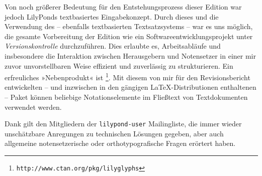 \documentclass{ulPlainA4}
\begin{document}
Von noch größerer Bedeutung für den Entstehungsprozess dieser Edition war jedoch LilyPonds textbasiertes Eingabekonzept.
Durch dieses und die Verwendung des -- ebenfalls textbasierten Textsatzsystems  -- war es uns möglich, die gesamte Vorbereitung der Edition wie ein Softwareentwicklungsprojekt unter \emph{Versionskontrolle} durchzuführen.
Dies erlaubte es, Arbeitsabläufe und insbesondere die Interaktion zwischen Herausgebern und Notensetzer in einer mir zuvor unvorstellbaren Weise effizient und zuverlässig zu strukturieren.
Ein erfreuliches »Nebenprodukt« ist \lilyglyphs{}%
\footnote{\texttt{http://www.ctan.org/pkg/lilyglyphs}}.
Mit diesem von mir für den Revisionsbericht entwickelten -- und inzwischen in den gängigen \LaTeX-Distributionen enthaltenen -- Paket können beliebige Notationselemente im Fließtext von Textdokumenten verwendet werden.

Dank gilt den Mitgliedern der \texttt{lilypond-user} Mailingliste, die immer wieder unschätzbare Anregungen zu technischen Lösungen gegeben, aber auch allgemeine notensetzerische oder orthotypografische Fragen erörtert haben.
\end{document}
